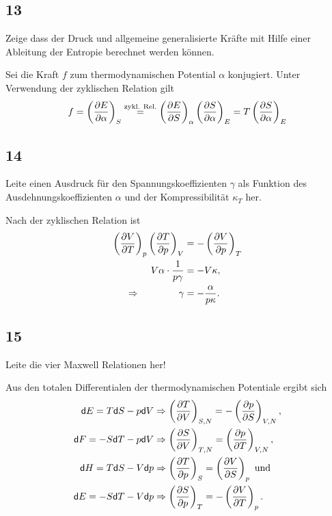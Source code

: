 \documentclass[12pt,a4paper]{report}
\newcommand{\dif}{\mathsf{d}}
\newcommand{\partddd}[3]{\ensuremath {\left(\frac{\partial #1}{\partial #2}}\right)_{#3}}
\newenvironment{myfrag}{\begin{it}}{\end{it}\vspace{3mm}\par}
\numberwithin{equation}{section}
\begin{document}
\subsection{13}
\begin{myfrag}
Zeige dass der Druck und allgemeine generalisierte Kräfte mit Hilfe einer
Ableitung der Entropie berechnet werden können.
\end{myfrag}
Sei die Kraft $f$ zum thermodynamischen Potential $\alpha$ konjugiert. Unter Verwendung der zyklischen Relation gilt
\begin{equation}
	f=\partddd{E}{\alpha}{S}\overset{\text{zykl. Rel.}}=\partddd{E}{S}{\alpha}\partddd{S}{\alpha}{E}=T\partddd{S}{\alpha}{E}
\end{equation}
\subsection{14}
\begin{myfrag}
Leite einen Ausdruck für den Spannungskoeffizienten $\gamma$ als Funktion des
Ausdehnungskoeffizienten $\alpha$ und der Kompressibilität $\kappa_T$ her.
\end{myfrag}
Nach der zyklischen Relation ist
\begin{align}
	\partddd{V}{T}{p}\partddd{T}{p}{V}&=-\partddd{V}{p}{T}\\
	V\alpha\cdot\frac{1}{p\gamma}&=-V\kappa,\\
	\Rightarrow\qquad\qquad\gamma&=-\frac{\alpha}{p\kappa}.
\end{align}
\subsection{15}
\begin{myfrag}
Leite die vier Maxwell Relationen her!
\end{myfrag}
Aus den totalen Differentialen der thermodynamischen Potentiale ergibt sich
\begin{align}
	\dif E = T \dif S - p\dif V &\Rightarrow \partddd{T}{V}{S,N}=-\partddd{p}{S}{V,N},\\
	\dif F = -S \dif T - p\dif V &\Rightarrow \partddd{S}{V}{T,N}=\partddd{p}{T}{V,N},\\
	\dif H = T \dif S - V\dif p &\Rightarrow \partddd{T}{p}{S}=\partddd{V}{S}{p}\text{ und}\\
	\dif E = -S \dif T - V\dif p &\Rightarrow \partddd{S}{p}{T}=-\partddd{V}{T}{p}.
\end{align}
\end{document}
